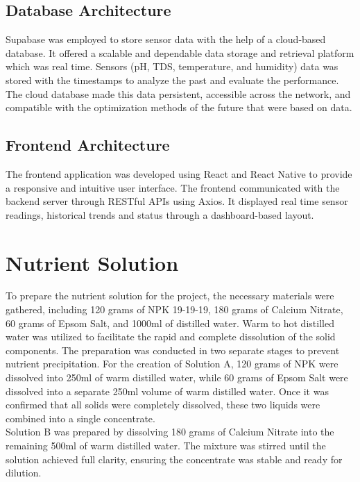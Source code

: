 \subsection{Database Architecture}
Supabase was employed to store sensor data with the help of a cloud-based database. It offered a scalable and dependable data storage and retrieval platform which was real time. Sensors (pH, TDS, temperature, and humidity) data was stored with the timestamps to analyze the past and evaluate the performance.\\[8pt]
The cloud database made this data persistent, accessible across the network, and compatible with the optimization methods of the future that were based on data.

\subsection{Frontend Architecture}
The frontend application was developed using React and React Native to provide a responsive and intuitive user interface. The frontend communicated with the backend server through RESTful APIs using Axios. It displayed real time sensor readings, historical trends and status through a dashboard-based layout.


\section{Nutrient Solution}
To prepare the nutrient solution for the project, the necessary materials were gathered, including 120 grams of NPK 19-19-19, 180 grams of Calcium Nitrate, 60 grams of Epsom Salt, and 1000ml of distilled water. Warm to hot distilled water was utilized to facilitate the rapid and complete dissolution of the solid components.
The preparation was conducted in two separate stages to prevent nutrient precipitation. For the creation of Solution A, 120 grams of NPK were dissolved into 250ml of warm distilled water, while 60 grams of Epsom Salt were dissolved into a separate 250ml volume of warm distilled water. Once it was confirmed that all solids were completely dissolved, these two liquids were combined into a single concentrate.\\[8pt]
Solution B was prepared by dissolving 180 grams of Calcium Nitrate into the remaining 500ml of warm distilled water. The mixture was stirred until the solution achieved full clarity, ensuring the concentrate was stable and ready for dilution.
